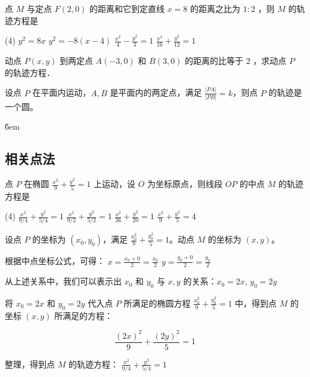\vspace{1em}

\begin{problem}
点 $M$ 与定点 $F(2,0)$ 的距离和它到定直线 $x=8$ 的距离之比为 $1: 2$ ，则 $M$ 的轨迹方程是

\begin{tasks}(4)
    \task $y^2=8 x$
    \task $y^2=-8(x-4)$
    \task $\frac{x^2}{4}-\frac{y^2}{3}=1$
    \task $\frac{x^2}{16}+\frac{y^2}{12}=1$
\end{tasks}
\end{problem}

\begin{problem}
动点 $P(x, y)$ 到两定点 $A(-3,0)$ 和 $B(3,0)$ 的距离的比等于 2 ，求动点 $P$ 的轨迹方程．
\end{problem}

\begin{theorem}[阿氏圆]
    设点 $P$ 在平面内运动，$A, B$ 是平面内的两定点，满足 $\frac{|PA|}{|PB|} = k$，则点 $P$ 的轨迹是一个圆。
\end{theorem}

\v{6em}

\subsection{相关点法}

\begin{example}
    点 $P$ 在椭圆 $\frac{x^2}{9} + \frac{y^2}{5} = 1$ 上运动，设 $O$ 为坐标原点，则线段 $OP$ 的中点 $M$ 的轨迹方程是
    \begin{tasks}(4)
        \task $\frac{x^2}{9/4} + \frac{y^2}{5/4} = 1$
        \task $\frac{x^2}{9/2} + \frac{y^2}{5/2} = 1$
        \task $\frac{x^2}{36} + \frac{y^2}{20} = 1$
        \task $\frac{x^2}{9} + \frac{y^2}{5} = 4$
    \end{tasks}
\end{example}
\begin{solution}
    设点 $P$ 的坐标为 $(x_0, y_0)$，满足 $\frac{x_0^2}{9} + \frac{y_0^2}{5} = 1$。动点 $M$ 的坐标为 $(x, y)$。

    根据中点坐标公式，可得：
    $x = \frac{x_0+0}{2} = \frac{x_0}{2}$
    $y = \frac{y_0+0}{2} = \frac{y_0}{2}$

    从上述关系中，我们可以表示出 $x_0$ 和 $y_0$ 与 $x, y$ 的关系：$x_0 = 2x$, $y_0 = 2y$

    将 $x_0 = 2x$ 和 $y_0 = 2y$ 代入点 $P$ 所满足的椭圆方程 $\frac{x_0^2}{9} + \frac{y_0^2}{5} = 1$ 中，得到点 $M$ 的坐标 $(x,y)$ 所满足的方程：

    $$\frac{(2x)^2}{9} + \frac{(2y)^2}{5} = 1$$

    整理，得到点 $M$ 的轨迹方程：
    $\frac{x^2}{9/4} + \frac{y^2}{5/4} = 1$
\end{solution}

